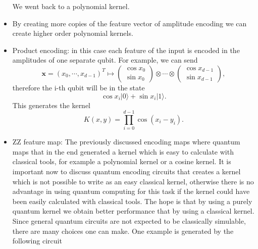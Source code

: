 \documentclass[12pt]{article}
\begin{document}
\begin{itemize}
\begin{equation}
    \end{equation}
    We went back to a polynomial kernel. 
    \item By creating more copies of the feature vector of amplitude encoding we can create higher order polynomial kernels. 
    \item Product encoding: in this case each feature of the input is encoded in the amplitudes of one separate qubit. For example, we can send
    \begin{equation}
        \mathbf{x}=(x_0, \cdots, x_{d-1})^T \mapsto  \begin{pmatrix}
            \cos x_0\\\sin x_0
           \end{pmatrix} \otimes \cdots \otimes \begin{pmatrix}
            \cos x_{d-1}\\\sin x_{d-1}
           \end{pmatrix},
    \end{equation}
    therefore the i-th qubit will be in the state 
    \begin{equation}
        \cos x_i|0\rangle +\sin x_i |1\rangle. 
    \end{equation}
    This generates the kernel 
    \begin{equation}
        K(x,y)=\prod_{i=0}^{d-1}\cos(x_i-y_i).
    \end{equation}
    \item ZZ feature map: The previously discussed encoding maps where quantum maps that in the end generated a kernel which is easy to calculate with classical tools, for example a polynomial kernel or a cosine kernel. It is important now to discuss quantum encoding circuits that creates a kernel which is not possible to write as an easy classical kernel, otherwise there is no advantage in using quantum computing for this task if the kernel could have been easily calculated with classical tools. The hope is that by using a purely quantum kernel we obtain better performance that by using a classical kernel. Since general quantum circuits are not expected to be classically simulable, there are many choices one can make. One example is generated by the following circuit 


\end{itemize}
\end{document}
